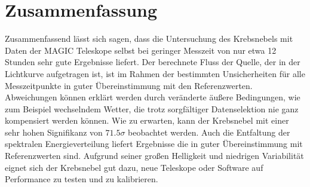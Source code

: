 \section{Zusammenfassung}
\label{sec:zusammenfassung}

Zusammenfassend lässt sich sagen, dass die Untersuchung des Krebsnebels mit Daten
der MAGIC Teleskope selbst bei geringer Messzeit von nur etwa 12 Stunden sehr gute
Ergebnisse liefert. Der berechnete Fluss der Quelle, der in der Lichtkurve
aufgetragen ist, ist im Rahmen der bestimmten Unsicherheiten für alle
Messzeitpunkte in guter Übereinstimmung mit den Referenzwerten. Abweichungen
können erklärt werden durch veränderte äußere Bedingungen, wie zum Beispiel
wechselndem Wetter, die trotz sorgfältiger Datenselektion nie ganz kompensiert
werden können. Wie zu erwarten, kann der Krebsnebel mit einer sehr hohen
Signifikanz von $\num{71.5}\sigma$ beobachtet werden. Auch die Entfaltung der
spektralen Energieverteilung liefert Ergebnisse die in guter Übereinstimmung mit
Referenzwerten sind. Aufgrund seiner großen Helligkeit und niedrigen
Variabilität eignet sich der Krebsnebel gut dazu, neue Teleskope oder Software
auf Performance zu testen und zu kalibrieren.
